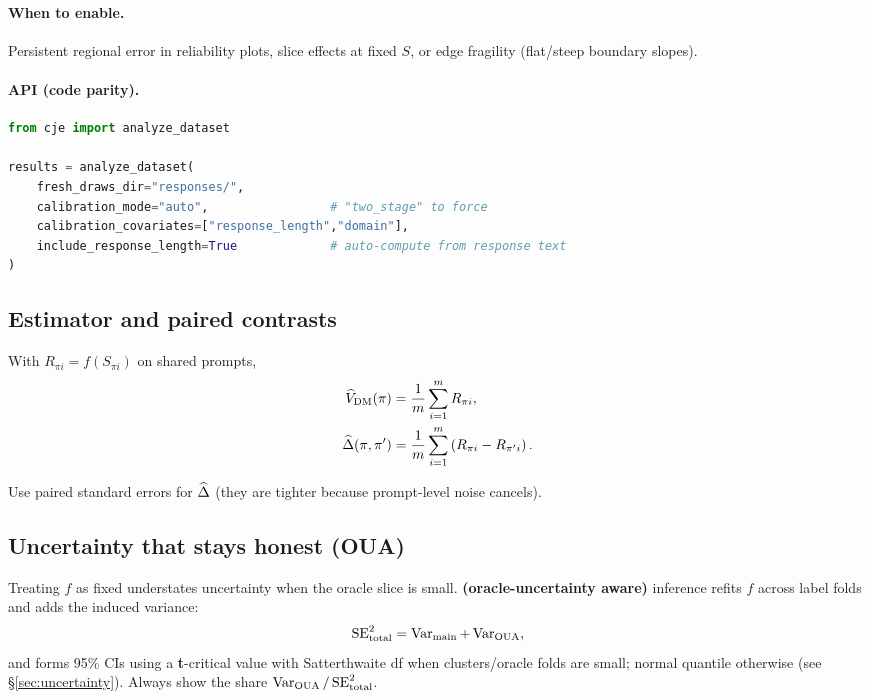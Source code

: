 \paragraph{When to enable.} Persistent regional error in reliability plots, slice effects at fixed $S$, or edge fragility (flat/steep boundary slopes).

\paragraph{API (code parity).}
\begin{lstlisting}[language=Python]
from cje import analyze_dataset

results = analyze_dataset(
    fresh_draws_dir="responses/",
    calibration_mode="auto",                 # "two_stage" to force
    calibration_covariates=["response_length","domain"],
    include_response_length=True             # auto-compute from response text
)
\end{lstlisting}

\subsection{Estimator and paired contrasts}

With $R_{\pi i} = f(S_{\pi i})$ on shared prompts,
\begin{align}
\widehat{V}_{\text{DM}}(\pi) &= \frac{1}{m} \sum_{i=1}^m R_{\pi i}, \\
\widehat{\Delta}(\pi, \pi') &= \frac{1}{m} \sum_{i=1}^m \left( R_{\pi i} - R_{\pi' i} \right).
\end{align}

Use paired standard errors for $\widehat{\Delta}$ (they are tighter because prompt-level noise cancels).

\subsection{Uncertainty that stays honest (OUA)}

Treating $f$ as fixed understates uncertainty when the oracle slice is small. \textbf{\oua{} (oracle-uncertainty aware)} inference refits $f$ across label folds and adds the induced variance:
\begin{equation}
\operatorname{SE}^2_{\text{total}} = \operatorname{Var}_{\text{main}} + \operatorname{Var}_{\text{OUA}},
\end{equation}
and forms 95\% CIs using a \textbf{t}-critical value with Satterthwaite df when clusters/oracle folds are small; normal quantile otherwise (see \S\ref{sec:uncertainty}). Always show the \oua{} share $\operatorname{Var}_{\text{OUA}}/\operatorname{SE}^2_{\text{total}}$.

